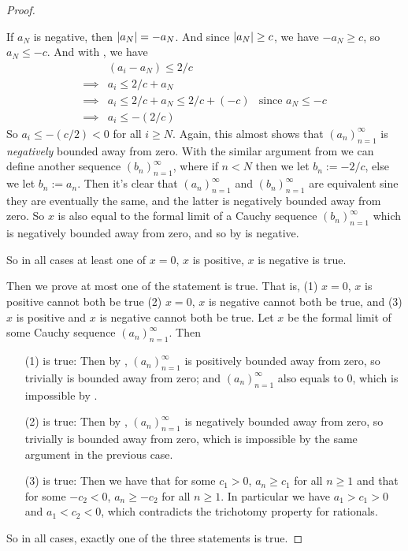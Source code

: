 \begin{proof}
\begin{itemize}
        If \(a_N\) is negative, then \(\lvert a_N\rvert = -a_N\).
        And since \(\lvert a_N\rvert \ge c\), we have \(-a_N \ge c\), so \(a_N \le -c\).
        And with , we have
        \begin{align*}
                     & (a_i - a_N) \le 2/c \\
            \implies & a_i \le 2/c + a_N \\
            \implies & a_i \le 2/c + a_N \le 2/c + (-c) & \text{since \(a_N \le -c\)} \\
            \implies & a_i \le -(2/c)
        \end{align*}
        So \(a_i \le -(c/2) < 0\) for all \(i \ge N\).
        Again, this almost shows that \((a_n)_{n = 1}^{\infty}\) is \emph{negatively} bounded away from zero.
        With the similar argument from  we can define another sequence \((b_n)_{n = 1}^{\infty}\), where if \(n < N\) then we let \(b_n := -2/c\), else we let \(b_n := a_n\).
        Then it's clear that \((a_n)_{n = 1}^{\infty}\) and \((b_n)_{n = 1}^{\infty}\) are equivalent sine they are eventually the same, and the latter is negatively bounded away from zero.
        So \(x\) is also equal to the formal limit of a Cauchy sequence \((b_n)_{n = 1}^{\infty}\) which is negatively bounded away from zero, and so by  is negative.
\end{itemize}
So in all cases at least one of \(x = 0\), \(x\) is positive, \(x\) is negative is true.

Then we prove at most one of the statement is true.
That is, (1) \(x = 0\), \(x\) is positive cannot both be true (2) \(x = 0\), \(x\) is negative cannot both be true, and (3) \(x\) is positive and \(x\) is negative cannot both be true.
Let \(x\) be the formal limit of some Cauchy sequence \((a_n)_{n = 1}^{\infty}\). Then
\begin{itemize}
    \item [(1) is true:] Then by , \((a_n)_{n = 1}^{\infty}\) is positively bounded away from zero, so trivially is bounded away from zero;
    and \((a_n)_{n = 1}^{\infty}\) also equals to 0, which is impossible by .
    \item [(2) is true:] Then by , \((a_n)_{n = 1}^{\infty}\) is negatively bounded away from zero, so trivially is bounded away from zero, which is impossible by the same argument in the previous case.
    \item [(3) is true:] Then we have that for some \(c_1 > 0\), \(a_n \ge c_1\) for all \(n \ge 1\) and that for some \(-c_2 < 0\), \(a_n \ge -c_2\) for all \(n \ge 1\).
    In particular we have \(a_1 > c_1 > 0\) and \(a_1 < c_2 < 0\), which contradicts the trichotomy property for rationals.
\end{itemize}
So in all cases, exactly one of the three statements is true.


\end{proof}
